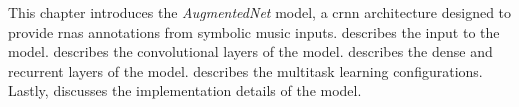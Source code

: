 

This chapter introduces the \emph{AugmentedNet} model, a
\gls{crnn} architecture designed to provide \glspl{rna}
annotations from symbolic music inputs. 
describes the input to the model.
 describes the
convolutional layers of the model.
 describes the dense and
recurrent layers of the model.
 describes the
multitask learning configurations. Lastly,
 discusses the implementation details
of the model.
